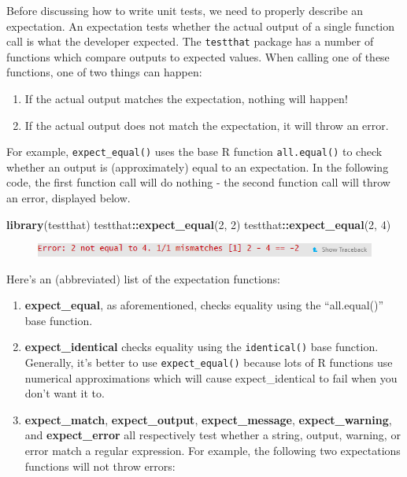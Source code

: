 \documentclass[]{book}
\newenvironment{Shaded}{\begin{snugshade}}{\end{snugshade}}
\newcommand{\KeywordTok}[1]{\textcolor[rgb]{0.13,0.29,0.53}{\textbf{#1}}}
\newcommand{\DecValTok}[1]{\textcolor[rgb]{0.00,0.00,0.81}{#1}}
\newcommand{\OperatorTok}[1]{\textcolor[rgb]{0.81,0.36,0.00}{\textbf{#1}}}
\newcommand{\NormalTok}[1]{#1}
\providecommand{\tightlist}{%
  \setlength{\itemsep}{0pt}\setlength{\parskip}{0pt}}
\begin{document}
Before discussing how to write unit tests, we need to properly describe
an expectation. An expectation tests whether the actual output of a
single function call is what the developer expected. The
\texttt{testthat} package has a number of functions which compare
outputs to expected values. When calling one of these functions, one of
two things can happen:

\begin{enumerate}
\def\labelenumi{\arabic{enumi}.}
\tightlist
\item
  If the actual output matches the expectation, nothing will happen!
\item
  If the actual output does not match the expectation, it will throw an
  error.
\end{enumerate}

For example, \texttt{expect\_equal()} uses the base R function
\texttt{all.equal()} to check whether an output is (approximately) equal
to an expectation. In the following code, the first function call will
do nothing - the second function call will throw an error, displayed
below.

\begin{Shaded}
\begin{Highlighting}[]
\KeywordTok{library}\NormalTok{(testthat)}
\NormalTok{testthat}\OperatorTok{::}\KeywordTok{expect_equal}\NormalTok{(}\DecValTok{2}\NormalTok{, }\DecValTok{2}\NormalTok{)}
\NormalTok{testthat}\OperatorTok{::}\KeywordTok{expect_equal}\NormalTok{(}\DecValTok{2}\NormalTok{, }\DecValTok{4}\NormalTok{)}
\end{Highlighting}
\end{Shaded}

\begin{figure}
\centering
\includegraphics{images/testSS/expectationerror.PNG}
\caption{}
\end{figure}

Here's an (abbreviated) list of the expectation functions:

\begin{enumerate}
\def\labelenumi{\arabic{enumi}.}
\tightlist
\item
  \textbf{expect\_equal}, as aforementioned, checks equality using the
  ``all.equal()'' base function.
\item
  \textbf{expect\_identical} checks equality using the
  \texttt{identical()} base function. Generally, it's better to use
  \texttt{expect\_equal()} because lots of R functions use numerical
  approximations which will cause expect\_identical to fail when you
  don't want it to.
\item
  \textbf{expect\_match}, \textbf{expect\_output},
  \textbf{expect\_message}, \textbf{expect\_warning}, and
  \textbf{expect\_error} all respectively test whether a string, output,
  warning, or error match a regular expression. For example, the
  following two expectations functions will not throw errors:
\end{enumerate}
\end{document}

